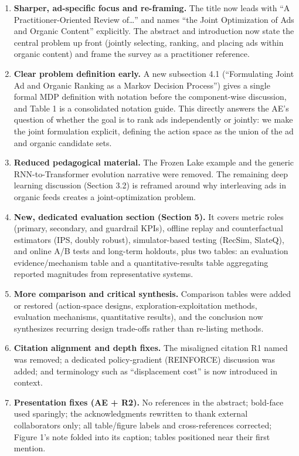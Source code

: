 \documentclass[11pt]{article}
\begin{document}
\begin{enumerate}
\item \textbf{Sharper, ad-specific focus and re-framing.} The title now leads
  with ``A Practitioner-Oriented Review of\dots'' and names ``the Joint
  Optimization of Ads and Organic Content'' explicitly. The abstract and
  introduction now state the central problem up front (jointly selecting,
  ranking, and placing ads within organic content) and frame the survey as a
  practitioner reference.

\item \textbf{Clear problem definition early.} A new subsection 4.1
  (``Formulating Joint Ad and Organic Ranking as a Markov Decision Process'')
  gives a single formal MDP definition with notation before the component-wise
  discussion, and Table 1 is a consolidated notation guide. This directly
  answers the AE's question of whether the goal is to rank ads independently or
  jointly: we make the joint formulation explicit, defining the action space as
  the union of the ad and organic candidate sets.

\item \textbf{Reduced pedagogical material.} The Frozen Lake example and the
  generic RNN-to-Transformer evolution narrative were removed. The remaining
  deep learning discussion (Section 3.2) is reframed around why interleaving
  ads in organic feeds creates a joint-optimization problem.

\item \textbf{New, dedicated evaluation section (Section 5).} It covers metric
  roles (primary, secondary, and guardrail KPIs), offline replay and counterfactual
  estimators (IPS, doubly robust), simulator-based testing (RecSim, SlateQ),
  and online A/B tests and long-term holdouts, plus two tables: an evaluation
  evidence/mechanism table and a quantitative-results table aggregating
  reported magnitudes from representative systems.

\item \textbf{More comparison and critical synthesis.} Comparison tables were
  added or restored (action-space designs, exploration-exploitation methods,
  evaluation mechanisms, quantitative results), and the conclusion now
  synthesizes recurring design trade-offs rather than re-listing methods.

\item \textbf{Citation alignment and depth fixes.} The misaligned citation R1
  named was removed; a dedicated policy-gradient (REINFORCE) discussion was
  added; and terminology such as ``displacement cost'' is now introduced in
  context.

\item \textbf{Presentation fixes (AE + R2).} No references in the abstract;
  bold-face used sparingly; the acknowledgments rewritten to thank external
  collaborators only; all table/figure labels and cross-references corrected;
  Figure 1's note folded into its caption; tables positioned near their first
  mention.
\end{enumerate}
\end{document}
